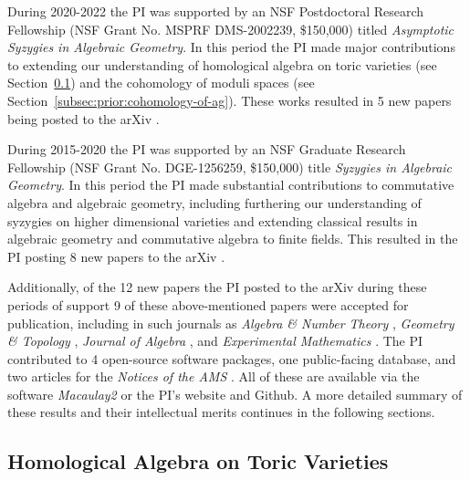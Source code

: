 \documentclass[11pt,reqno]{amsart}
\theoremstyle{remark}
\begin{document}
During 2020-2022 the PI was supported by an NSF Postdoctoral Research Fellowship (NSF Grant No. MSPRF DMS-2002239, \$150,000) titled \textit{Asymptotic Syzygies in Algebraic Geometry}. In this period the PI made major contributions to extending our understanding of homological algebra on toric varieties (see Section~\ref{subsec:prior:homological-algebra-on-toric}) and the cohomology of moduli spaces (see Section~\ref{subsec:prior:cohomology-of-ag}). These works resulted in 5 new papers being posted to the arXiv \cite{BCEGLY22,bruceHellerSayrafi21,bruceHellerSayrafi22,brandtBruceCorey23,BBCMMW24}.

During 2015-2020 the PI was supported by an NSF Graduate Research Fellowship (NSF Grant No. DGE-1256259, \$150,000) title \textit{Syzygies in Algebraic Geometry}. In this period the PI made substantial contributions to commutative algebra and algebraic geometry, including furthering our understanding of syzygies on higher dimensional varieties and extending classical results in algebraic geometry and commutative algebra to finite fields. This resulted in the PI posting 8 new papers to the arXiv \cite{ABLS20,BBBKR17,bruceErman19,bruceLi20,BEGY20,BEGY21,bruce24,bruce22}.

Additionally, of the 12 new papers the PI posted to the arXiv during these periods of support 9 of these above-mentioned papers were accepted for publication, including in such journals as \textit{Algebra \& Number Theory} \cite{bruceErman19}, \textit{Geometry \& Topology} \cite{BBCMMW24}, \textit{Journal of Algebra} \cite{BCEGLY22}, and \textit{Experimental Mathematics} \cite{BEGY20}. The PI contributed to 4 open-source software packages, one public-facing database, and two articles for the \textit{Notices of the AMS} \cite{BBB21,bruceNotices22}. All of these are available via the software \textit{Macaulay2} or the PI's website and Github. A more detailed summary of these results and their intellectual merits continues in the following sections. 

\subsection{Homological Algebra on Toric Varieties}\label{subsec:prior:homological-algebra-on-toric}
\end{document}
